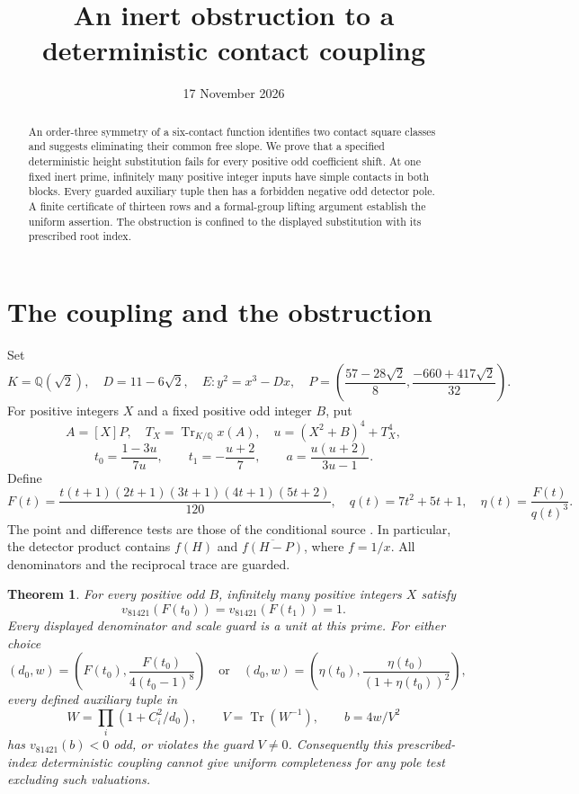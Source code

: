 \documentclass[11pt,a4paper]{article}
\title{An inert obstruction to a deterministic contact coupling}
\author{}\date{17 November 2026}
\newtheorem{theorem}{Theorem}[section]
\newcommand{\Q}{\mathbb Q}\newcommand{\Z}{\mathbb Z}
\DeclareMathOperator{\Tr}{Tr}
\begin{document}
\maketitle
\begin{abstract}
An order-three symmetry of a six-contact function identifies two
contact square classes and suggests eliminating their common free
slope. We prove that a specified deterministic height substitution
fails for every positive odd coefficient shift. At one fixed inert
prime, infinitely many positive integer inputs have simple contacts
in both blocks. Every guarded auxiliary tuple then has a forbidden
negative odd detector pole. A finite certificate of thirteen rows
and a formal-group lifting argument establish the uniform assertion.
The obstruction is confined to the displayed substitution with its
prescribed root index.
\end{abstract}

\section{The coupling and the obstruction}

Set
\[
 K=\Q(\sqrt2),\quad D=11-6\sqrt2,\quad E:y^2=x^3-Dx,
 \quad P=\left(\frac{57-28\sqrt2}{8},
                 \frac{-660+417\sqrt2}{32}\right).
\]
For positive integers \(X\) and a fixed positive odd integer \(B\), put
\[
 A=[X]P,\quad T_X=\Tr_{K/\Q}x(A),\quad
 u=(X^2+B)^4+T_X^4,
\]
\begin{equation}\label{eq:coupling}
 t_0=\frac{1-3u}{7u},\qquad t_1=-\frac{u+2}{7},\qquad
 a=\frac{u(u+2)}{3u-1}.
\end{equation}
Define
\[
 F(t)=\frac{t(t+1)(2t+1)(3t+1)(4t+1)(5t+2)}{120},
 \quad q(t)=7t^2+5t+1,\quad \eta(t)=\frac{F(t)}{q(t)^3}.
\]
The point and difference tests are those of the conditional source
\cite{Conditional,Reweighted}. In particular, the detector product
contains \(f(H)\) and \(\overline{f(H-P)}\), where \(f=1/x\).
All denominators and the reciprocal trace are guarded.

\begin{theorem}\label{thm:main}
For every positive odd \(B\), infinitely many positive integers \(X\)
satisfy
\[
 v_{81421}(F(t_0))=v_{81421}(F(t_1))=1.
\]
Every displayed denominator and scale guard is a unit at this prime.
For either choice
\[
 (d_0,w)=\left(F(t_0),\frac{F(t_0)}{4(t_0-1)^8}\right)
 \quad\text{or}\quad
 (d_0,w)=\left(\eta(t_0),
                  \frac{\eta(t_0)}{(1+\eta(t_0))^2}\right),
\]
every defined auxiliary tuple in
\[
 W=\prod_i(1+C_i^2/d_0),\qquad V=\Tr(W^{-1}),\qquad b=4w/V^2
\]
has \(v_{81421}(b)<0\) odd, or violates the guard \(V\ne0\).
Consequently this prescribed-index deterministic coupling cannot give
uniform completeness for any pole test excluding such valuations.
\end{theorem}
\end{document}
